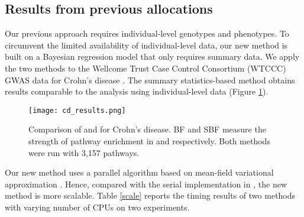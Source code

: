 \documentclass[10pt]{article}
\begin{document}
\subsection*{Results from previous
allocations}\label{xiang-results-from-previous-allocations}

Our previous approach \cite{carbonetto.stephens:integrated} requires
individual-level genotypes and phenotypes. To circumvent the limited
availability of individual-level data, our new method is built on a
Bayesian regression model \cite{zhu.stephens:bayesian} that only
requires summary data. We apply the two methods to the Wellcome Trust
Case Control Consortium (WTCCC) GWAS data for Crohn's disease
\cite{wellcome-trust-case-control-consortium:genome-wide}. The summary
statistics-based method obtains results comparable to the analysis
using individual-level data (Figure \ref{xiang-figure}).
\begin{figure}
\begin{center}
\texttt{[image: cd\_results.png]}
  \caption{Comparison of \cite{carbonetto.stephens:integrated} and
    \cite{zhu.stephens:bayesian} for Crohn's disease. BF and SBF
    measure the strength of pathway enrichment in
    \cite{carbonetto.stephens:integrated} and
    \cite{zhu.stephens:bayesian} respectively. Both methods were run
    with 3,157 pathways.}
  \label{xiang-figure}
\end{center}
\end{figure}

Our new method uses a parallel algorithm based on mean-field
variational approximation \cite{wainwright.jordan:graphical}. Hence,
compared with the serial implementation in
\cite{carbonetto.stephens:integrated}, the new method is more
scalable. Table \ref{scale} reports the timing results of two
methods with varying number of CPUs on two experiments.
\end{document}
